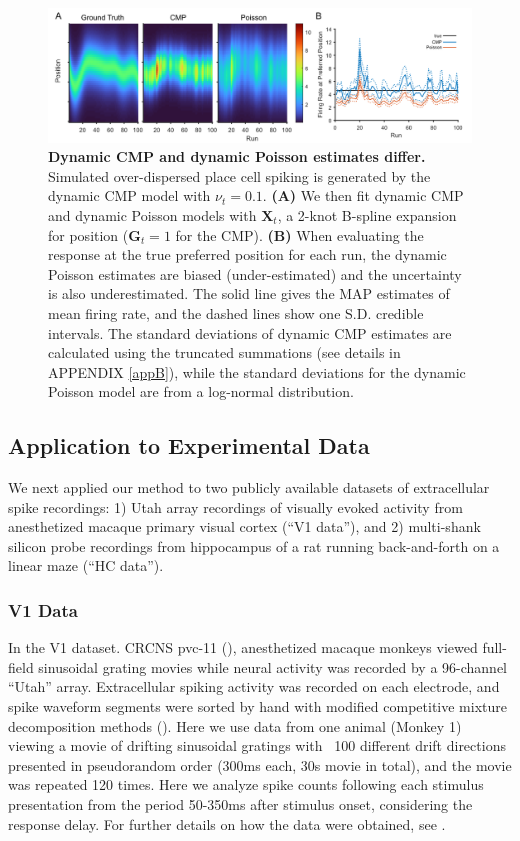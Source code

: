 \documentclass[aoas]{imsart}
\theoremstyle{plain}
\theoremstyle{remark}
\begin{document}
\begin{figure}[h!]
	\centering
	\includegraphics[width=1\textwidth]{figure3.png}
	\caption{\textbf{Dynamic CMP and dynamic Poisson estimates differ.} Simulated over-dispersed place cell spiking is generated by the dynamic CMP model with $\nu_t = 0.1$. \textbf{(A)} We then fit dynamic CMP and dynamic Poisson models with $\bm{X}_t$, a 2-knot B-spline expansion for position ($\bm{G}_t = 1$ for the CMP). \textbf{(B)} When evaluating the response at the true preferred position for each run, the dynamic Poisson estimates are biased (under-estimated) and the uncertainty is also underestimated. The solid line gives the MAP estimates of mean firing rate, and the dashed lines show one S.D. credible intervals. The standard deviations of dynamic CMP estimates are calculated using the truncated summations (see details in APPENDIX \ref{appB}), while the standard deviations for the dynamic Poisson model are from a log-normal distribution.}
	\label{fig3}
\end{figure}

\subsection{Application to Experimental Data}
We next applied our method to two publicly available datasets of extracellular spike recordings: 1) Utah array recordings of visually evoked activity from anesthetized macaque primary visual cortex (“V1 data”), and 2) multi-shank silicon probe recordings from hippocampus of a rat running back-and-forth on a linear maze (“HC data”).

\subsubsection{V1 Data}
In the V1 dataset. CRCNS pvc-11 (\cite{Kohn2016}), anesthetized macaque monkeys viewed full-field sinusoidal grating movies while neural activity was recorded by a 96-channel “Utah” array. Extracellular spiking activity was recorded on each electrode, and spike waveform segments were sorted by hand with modified competitive mixture decomposition methods (\cite{Shoham2003}). Here we use data from one animal (Monkey 1) viewing a movie of drifting sinusoidal gratings with ~100 different drift directions presented in pseudorandom order (300ms each, 30s movie in total), and the movie was repeated 120 times. Here we analyze spike counts following each stimulus presentation from the period 50-350ms after stimulus onset, considering the response delay. For further details on how the data were obtained, see \cite{Kelly2010,Smith2008}.
\end{document}
